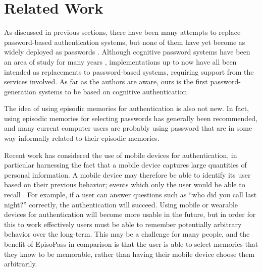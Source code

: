 \documentclass[runningheads,a4paper]{llncs}
\begin{document}

\section{Related Work}


As discussed in previous sections,
there have been many attempts to replace password-based authentication systems,
but none of them have yet become as widely deployed as
passwords \cite{Bonneau:ReplacePasswords}.
%
Although cognitive password systems have been an area of study for 
many years \cite{Lazar2011,Zviran:1990:UAC:100512.100538},
implementations up to now have all been intended as replacements 
to password-based systems, requiring support from the services involved.
As far as the authors are aware, ours is the first password-generation systems to be
based on cognitive authentication.


The idea of using episodic memories for authentication is also not new.
In fact, using episodic memories for selecting passwords
has generally been recommended,
and many current computer users are probably using password that are
in some way informally related to their episodic memories.

Recent work has considered the use of mobile devices for authentication,
in particular harnessing the fact that a mobile device captures large quantities
of personal information. A mobile device may therefore be able to identify
its user based on their previous behavior; events which only the user would be able to recall \cite{Dandapat:2015:AYD:2702123.2702457,Das:2013:ECE:2493432.2493453,GuptaWRLGB12}%
.
For example, if a user can answer questions such as
``who did you call last night?'' correctly, the authentication will succeed.
Using mobile or wearable devices for authentication will become more usable
in the future,
but in order for this to work effectively users must be able to remember potentially
arbitrary behavior over the long-term. This may be a challenge for many people, and the 
benefit of EpisoPass in comparison is that the user is able to select memories that they
know to be memorable, rather than having their mobile device choose them arbitrarily.
\end{document}
